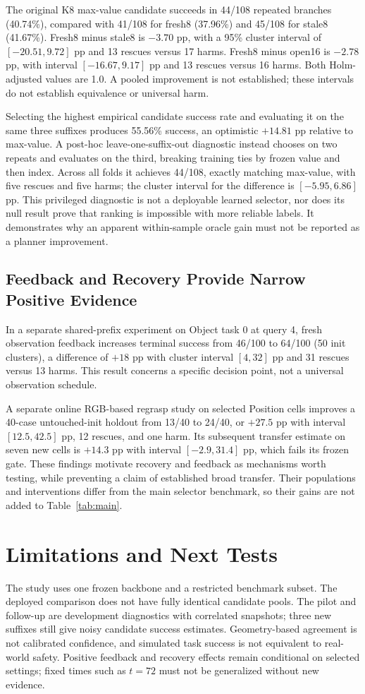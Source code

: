 \documentclass{article}
\begin{document}
The original K8 max-value candidate succeeds in 44/108 repeated branches
(40.74\%), compared with 41/108 for fresh8 (37.96\%) and 45/108 for stale8
(41.67\%). Fresh8 minus stale8 is $-3.70$ pp, with a 95\% cluster interval
of $[-20.51,9.72]$ pp and 13 rescues versus 17 harms. Fresh8 minus open16
is $-2.78$ pp, with interval $[-16.67,9.17]$ pp and 13 rescues versus 16
harms. Both Holm-adjusted values are 1.0. A pooled improvement is not
established; these intervals do not establish equivalence or universal harm.

Selecting the highest empirical candidate success rate and evaluating it on
the same three suffixes produces 55.56\% success, an optimistic $+14.81$ pp
relative to max-value. A post-hoc leave-one-suffix-out diagnostic instead
chooses on two repeats and evaluates on the third, breaking training ties
by frozen value and then index. Across all folds it achieves 44/108, exactly
matching max-value, with five rescues and five harms; the cluster interval
for the difference is $[-5.95,6.86]$ pp. This privileged diagnostic is not a
deployable learned selector, nor does its null result prove that ranking
is impossible with more reliable labels. It demonstrates why an apparent
within-sample oracle gain must not be reported as a planner improvement.

\subsection{Feedback and Recovery Provide Narrow Positive Evidence}
In a separate shared-prefix experiment on Object task 0 at query 4, fresh
observation feedback increases terminal success from 46/100 to 64/100
(50 init clusters), a difference of $+18$ pp with cluster interval
$[4,32]$ pp and 31 rescues versus 13 harms. This result concerns a specific
decision point, not a universal observation schedule.

A separate online RGB-based regrasp study on selected Position cells improves
a 40-case untouched-init holdout from 13/40 to 24/40, or $+27.5$ pp with
interval $[12.5,42.5]$ pp, 12 rescues, and one harm. Its subsequent transfer
estimate on seven new cells is $+14.3$ pp with interval $[-2.9,31.4]$ pp,
which fails its frozen gate. These findings motivate recovery and feedback
as mechanisms worth testing, while preventing a claim of established broad
transfer. Their populations and interventions differ from the main selector
benchmark, so their gains are not added to Table~\ref{tab:main}.

\section{Limitations and Next Tests}
The study uses one frozen backbone and a restricted benchmark subset.
The deployed comparison does not have fully identical candidate pools.
The pilot and follow-up are development diagnostics with correlated
snapshots; three new suffixes still give noisy candidate success estimates.
Geometry-based agreement is not calibrated confidence,
and simulated task success is not equivalent to real-world safety. Positive
feedback and recovery effects remain conditional on selected settings;
fixed times such as $t=72$ must not be generalized without new evidence.
\end{document}
